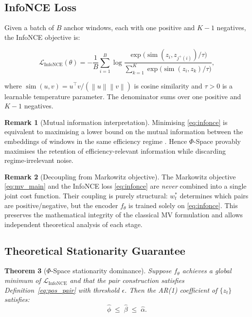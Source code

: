 \documentclass[12pt, a4paper]{report}
\theoremstyle{plain}
\newtheorem{theorem}{Theorem}[section]
\theoremstyle{definition}
\newtheorem{remark}[theorem]{Remark}
\newcommand{\norm}[1]{\left\|#1\right\|}
\begin{document}
\subsection{InfoNCE Loss}
\label{subsec:infonce}

Given a batch of $B$ anchor windows, each with one positive and $K-1$ negatives,
the InfoNCE objective is:

\begin{equation}
  \boxed{
  \mathcal{L}_{\text{InfoNCE}}(\theta) =
    -\frac{1}{B}\sum_{i=1}^{B}
    \log
    \frac{
      \exp\!\bigl(\operatorname{sim}(z_i, z_{j^+(i)})/\tau\bigr)
    }{
      \displaystyle\sum_{k=1}^{K}
      \exp\!\bigl(\operatorname{sim}(z_i, z_k)/\tau\bigr)
    },
  }
  \label{eq:infonce}
\end{equation}

where $\operatorname{sim}(u, v) = u^\top v / (\norm{u}\norm{v})$ is cosine
similarity and $\tau > 0$ is a learnable temperature parameter.  The denominator
sums over one positive and $K-1$ negatives.

\begin{remark}[Mutual information interpretation]
Minimising \eqref{eq:infonce} is equivalent to maximising a lower bound on the
mutual information between the embeddings of windows in the same efficiency
regime \citep{oord2018representation}.  Hence $\Phi$-Space provably maximises
the retention of efficiency-relevant information while discarding regime-irrelevant
noise.
\end{remark}

\begin{remark}[Decoupling from Markowitz objective]
The Markowitz objective \eqref{eq:mv_main} and the InfoNCE loss
\eqref{eq:infonce} are \emph{never} combined into a single joint cost function.
Their coupling is purely structural: $w_t^*$ determines which pairs are
positive/negative, but the encoder $f_\theta$ is trained solely on
\eqref{eq:infonce}.  This preserves the mathematical integrity of the classical
MV formulation and allows independent theoretical analysis of each stage.
\end{remark}

\subsection{Theoretical Stationarity Guarantee}
\label{subsec:phi_stationarity}

\begin{theorem}[$\Phi$-Space stationarity dominance]
\label{thm:stationarity}
Suppose $f_\theta$ achieves a global minimum of $\mathcal{L}_{\text{InfoNCE}}$
and that the pair construction satisfies Definition~\eqref{eq:pos_pair} with
threshold $\epsilon$.  Then the AR(1) coefficient of $\{z_t\}$ satisfies:
\[
  \hat{\phi} \;\le\; \hat{\beta} \;\le\; \hat{\alpha}.
\]
\end{theorem}
\end{document}
